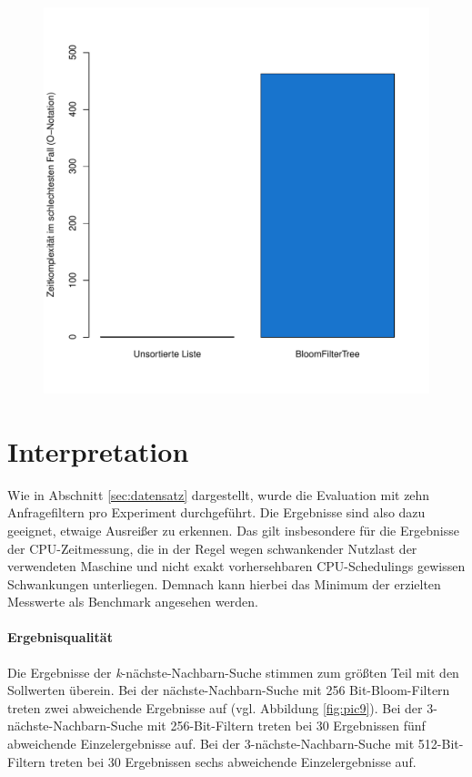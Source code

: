 \begin{figure}[hptb]
	\centering
	\label{fig:pic20}
	\includegraphics[scale=0.7]{pictures/cost.pdf}
\end{figure}
\section{Interpretation}\label{sec:interpretation}
Wie in Abschnitt \ref{sec:datensatz} dargestellt, wurde die Evaluation mit zehn Anfragefiltern pro Experiment durchgeführt. Die Ergebnisse sind also dazu geeignet, etwaige Ausreißer zu erkennen. Das gilt insbesondere für die Ergebnisse der CPU-Zeitmessung, die in der Regel wegen schwankender Nutzlast der verwendeten Maschine und nicht exakt vorhersehbaren CPU-Schedulings gewissen Schwankungen unterliegen. Demnach kann hierbei das Minimum der erzielten Messwerte als Benchmark angesehen werden. 
\paragraph*{Ergebnisqualität}
Die Ergebnisse der \textit{k}-nächste-Nachbarn-Suche stimmen zum größten Teil mit den Sollwerten überein. Bei der nächste-Nachbarn-Suche mit 256 Bit-Bloom-Filtern treten zwei abweichende Ergebnisse auf (vgl. Abbildung \ref{fig:pic9}). Bei der 3-nächste-Nachbarn-Suche mit 256-Bit-Filtern treten bei 30 Ergebnissen fünf abweichende Einzelergebnisse auf. Bei der 3-nächste-Nachbarn-Suche mit 512-Bit-Filtern treten bei 30 Ergebnissen sechs abweichende Einzelergebnisse auf. 

